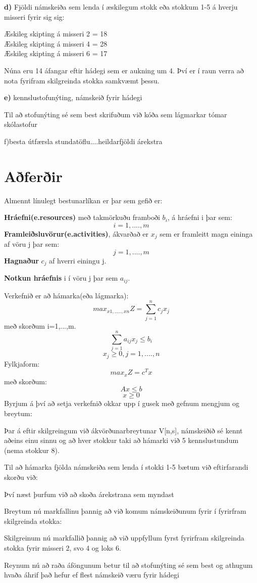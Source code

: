 \documentclass[a4paper,12pt]{article}
\begin{document}
\textbf{d) } Fjöldi námskeiða sem lenda í æskilegum stokk eða stokkum 1-5 á hverju misseri fyrir sig sig:

Æskileg skipting á misseri 2 = 18\\
Æskileg skipting á misseri 4 = 28\\
Æskileg skipting á misseri 6 = 17

Núna eru 14 áfangar eftir hádegi sem er aukning um 4. Því er í raun verra að nota fyrifram skilgreinda stokka samkvæmt þessu.

\textbf{e) }kennslustofunýting, námskeið fyrir hádegi


Til að stofunýting sé sem best skrifuðum við kóða sem lágmarkar tómar skólastofur

f)besta útfærsla stundatöflu....heildarfjöldi árekstra

\section{Aðferðir}
Almennt línulegt bestunarlíkan er þar sem gefið er:

\textbf{Hráefni(e.resources)} með takmörkuðu framboði  $b_i$, á hráefni i þar sem:
\[i=1,....,m\]
\textbf{Framleiðsluvörur(e.activities)}, ákvarðað er $x_j$ sem er framleitt magn eininga af vöru j þar sem:
\[j=1,....,m\]
\textbf{Hagnaður} $c_j$ af hverri einingu j. 

\textbf{Notkun hráefnis} i í vöru j þar sem $a_{ij}$.

Verkefnið er að hámarka(eða lágmarka):
\[max_{x1,.....,xn}Z = \sum_{j=1}^{n}c_j x_j\]
með skorðum i=1,...,m.
\[\sum_{j=1}^{n}a_{ij} x_j\leq b_i\]
\[x_j\geq 0, j=1,....,n\]
Fylkjaform:
\[max_xZ=c^Tx\]
með skorðum:
\[Ax\leq b\]
\[x\geq 0\]
Byrjum á því að setja verkefnið okkar upp í gusek með gefnum mengjum og breytum:

Þar á eftir skilgreingum við ákvörðunarbreytunar V[n,s], námskeiðið sé kennt aðeins einu sinnu og að 
hver stokkur taki að hámarki við 5 kennslustundum (nema stokkur 8).


Til að hámarka fjölda námskeiða sem lenda í stokki 1-5 bætum við eftirfarandi skorðu við:

Því næst þurfum við að skoða árekstrana sem myndast

Breytum nú markfallinu þannig að við komum námskeiðunum fyrir í fyrirfram skilgreinda stokka:

Skilgreinum nú markfallið þannig að við uppfyllum fyrst fyrirfram skilgreinda stokka fyrir misseri 2, svo 4 og loks 6.

Reynum nú að raða áföngunum betur til að stofunýting sé sem best og athugum hvaða áhrif það hefur ef flest námskeið væru fyrir hádegi

\end{document}
